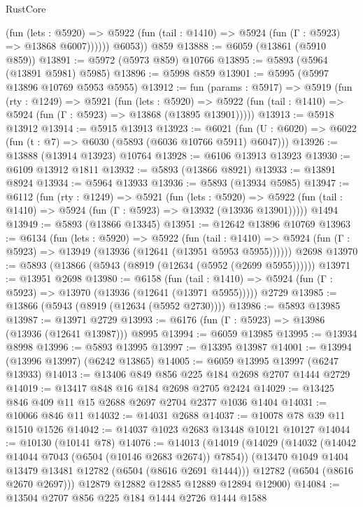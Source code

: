 \begin{lexlean}{RustCore}
\begin{coremodule}
              (fun (lets : @5920) =>
              @5922 (fun (tail : @1410) => @5924 (fun (Γ : @5923) => @13868 @6007))))))
        @6053))
    @859
@13888 := @6059 (@13861 (@5910 @859))
@13891 := @5972 (@5973 @859) @10766
@13895 := @5893 (@5964 (@13891 @5981) @5985)
@13896 := @5998 @859
@13901 := @5995 (@5997 @13896 @10769 @5953 @5955)
@13912 := fun (params : @5917) =>
  @5919
    (fun (rty : @1249) =>
    @5921
      (fun (lets : @5920) =>
      @5922 (fun (tail : @1410) => @5924 (fun (Γ : @5923) => @13868 (@13895 @13901)))))
@13913 := @5918 @13912
@13914 := @5915 @13913
@13923 := @6021
    (fun (U : @6020) => @6022 (fun (t : @7) => @6030 (@5893 (@6036 @10766 @5911) @6047)))
@13926 := @13888 (@13914 @13923) @10764
@13928 := @6106 @13913 @13923
@13930 := @6109 @13912 @1811
@13932 := @5893 (@13866 @8921)
@13933 := @13891 @8924
@13934 := @5964 @13933
@13936 := @5893 (@13934 @5985)
@13947 := @6112
    (fun (rty : @1249) =>
    @5921
      (fun (lets : @5920) =>
      @5922 (fun (tail : @1410) => @5924 (fun (Γ : @5923) => @13932 (@13936 @13901)))))
    @1494
@13949 := @5893 (@13866 @13345)
@13951 := @12642 @13896 @10769
@13963 := @6134
    (fun (lets : @5920) =>
    @5922
      (fun (tail : @1410) =>
      @5924 (fun (Γ : @5923) => @13949 (@13936 (@12641 (@13951 @5953 @5955))))))
    @2698
@13970 := @5893 (@13866 (@5943 (@8919 (@12634 (@5952 (@2699 @5955))))))
@13971 := @13951 @2698
@13980 := @6158
    (fun (tail : @1410) => @5924 (fun (Γ : @5923) => @13970 (@13936 (@12641 (@13971 @5955)))))
    @2729
@13985 := @13866 (@5943 (@8919 (@12634 (@5952 @2730))))
@13986 := @5893 @13985
@13987 := @13971 @2729
@13993 := @6176 (fun (Γ : @5923) => @13986 (@13936 (@12641 @13987))) @8995
@13994 := @6059 @13985
@13995 := @13934 @8998
@13996 := @5893 @13995
@13997 := @13395 @13987
@14001 := @13994 (@13996 @13997) (@6242 @13865)
@14005 := @6059 @13995 @13997 (@6247 @13933)
@14013 := @13406 @849 @856 @225 @184 @2698 @2707 @1444 @2729
@14019 := @13417 @848 @16 @184 @2698 @2705 @2424
@14029 := @13425 @846 @409 @11 @15 @2688 @2697 @2704 @2377 @1036 @1404
@14031 := @10066 @846 @11
@14032 := @14031 @2688
@14037 := @10078 @78 @39 @11 @1510 @1526
@14042 := @14037 @1023 @2683 @13448 @10121 @10127
@14044 := @10130 (@10141 @78)
@14076 := @14013
    (@14019
      (@14029
        (@14032 (@14042 @14044 @7043 (@6504 (@10146 @2683 @2674)) @7854))
        (@13470 @1049 @1404 @13479 @13481 @12782 (@6504 (@8616 @2691 @1444)))
        @12782
        (@6504 (@8616 @2670 @2697)))
      @12879
      @12882
      @12885
      @12889
      @12894
      @12900)
@14084 := @13504 @2707 @856 @225 @184 @1444 @2726 @1444 @1588

\end{coremodule}
\end{lexlean}
